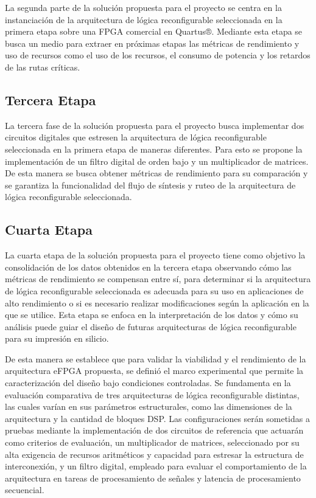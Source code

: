 La segunda parte de la solución propuesta para el proyecto se centra en la instanciación de 
la arquitectura de lógica reconfigurable seleccionada en la primera etapa sobre una FPGA 
comercial en Quartus®. Mediante esta etapa se busca un medio para extraer en próximas etapas las métricas 
de rendimiento y uso de recursos como el uso de los recursos, el consumo de potencia y los 
retardos de las rutas críticas.

\subsection{Tercera Etapa}

La tercera fase de la solución propuesta para el proyecto busca implementar dos circuitos 
digitales que estresen la arquitectura de lógica reconfigurable seleccionada en la primera 
etapa de maneras diferentes. Para esto se propone la implementación de un filtro digital 
de orden bajo y un multiplicador de matrices. De esta manera se busca obtener métricas de 
rendimiento para su comparación y se garantiza la funcionalidad del flujo de síntesis y 
ruteo de la arquitectura de lógica reconfigurable seleccionada.

\subsection{Cuarta Etapa}

La cuarta etapa de la solución propuesta para el proyecto tiene como objetivo la consolidación 
de los datos obtenidos en la tercera etapa observando cómo las métricas de rendimiento se 
compensan entre sí, para determinar si la arquitectura de lógica reconfigurable seleccionada 
es adecuada para su uso en aplicaciones de alto rendimiento o si es necesario realizar 
modificaciones según la aplicación en la que se utilice. Esta etapa se enfoca en la 
interpretación de los datos y cómo su análisis puede guiar el diseño de futuras arquitecturas 
de lógica reconfigurable para su impresión en silicio.

De esta manera se establece que para validar la viabilidad y el rendimiento de la arquitectura 
eFPGA propuesta, se definió el marco experimental que permite la caracterización del diseño bajo 
condiciones controladas. Se fundamenta en la evaluación comparativa de tres arquitecturas de 
lógica reconfigurable distintas, las cuales varían en sus parámetros estructurales, como las dimensiones de la arquitectura y la cantidad de bloques DSP. Las configuraciones serán 
sometidas a pruebas mediante la implementación de dos circuitos de referencia que actuarán 
como criterios de evaluación, un multiplicador de matrices, seleccionado por su alta 
exigencia de recursos aritméticos y capacidad para estresar la estructura de interconexión, 
y un filtro digital, empleado para evaluar el comportamiento de la arquitectura en tareas de 
procesamiento de señales y latencia de procesamiento secuencial.

